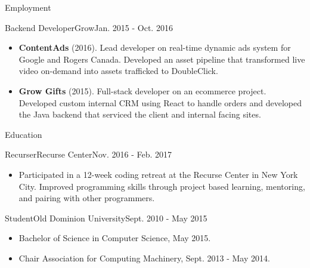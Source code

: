 \documentclass[]{mcdowellcv}
\begin{document}
\begin{cvsection}{Employment}
        \begin{cvsubsection}{Backend Developer}{Grow}{Jan. 2015 - Oct. 2016}
            \begin{itemize}
                \item \textbf{ContentAds} (2016). Lead developer on real-time dynamic ads system for Google and Rogers Canada. \newline 
                Developed an asset pipeline that transformed live video on-demand into assets trafficked to DoubleClick.
            \end{itemize}
            \begin{itemize}
                \item \textbf{Grow Gifts} (2015). Full-stack developer on an ecommerce project. Developed custom internal CRM using React to handle orders and developed the Java backend that serviced the client and internal facing sites.
            \end{itemize}
        \end{cvsubsection}
    \end{cvsection}

    \begin{cvsection}{Education}
        \begin{cvsubsection}{Recurser}{Recurse Center}{Nov. 2016 - Feb. 2017}
            \begin{itemize}
                \item Participated in a 12-week coding retreat at the Recurse Center in New York City.\newline 
                Improved programming skills through project based learning, mentoring, and pairing with other programmers.
            \end{itemize}
        \end{cvsubsection}
        \begin{cvsubsection}{Student}{Old Dominion University}{Sept. 2010 - May 2015}
            \begin{itemize}
                \item Bachelor of Science in Computer Science, May 2015.
                \item Chair Association for Computing Machinery, Sept. 2013 - May 2014.
            \end{itemize}
        \end{cvsubsection}
    \end{cvsection}
\end{document}
